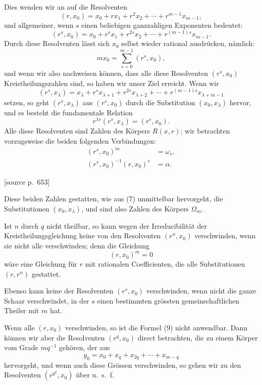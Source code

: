 \documentclass[11pt]{article}
\newcommand{\srcpage}[1]{\par\medskip\noindent\textsf{[source p.~#1]}\par\smallskip}
\begin{document}
Dies wenden wir an auf die Resolventen
\begin{equation}
  (r,x_0)=x_0+rx_1+r^2x_2+\cdots+r^{m-1}x_{m-1},
\tag{3}
\end{equation}
und allgemeiner, wenn $s$ einen beliebigen ganzzahligen Exponenten bedeutet:
\begin{equation}
  (r^s,x_0)=x_0+r^s x_1+r^{2s}x_2+\cdots+r^{(m-1)s}x_{m-1}.
\tag{4}
\end{equation}
Durch diese Resolventen lässt sich $x_0$ selbst wieder rational ausdrücken, nämlich:
\begin{equation}
  mx_0=\sum_{s=0}^{m-1}(r^s,x_0),
\tag{5}
\end{equation}
und wenn wir also nachweisen können, dass alle diese Resolventen $(r^s,x_0)$ Kreistheilungszahlen sind, so haben wir unser Ziel erreicht. Wenn wir
\begin{equation}
  (r^s,x_\lambda)=x_\lambda+r^s x_{\lambda+1}+r^{2s}x_{\lambda+2}+\cdots+r^{(m-1)s}x_{\lambda+m-1}
\tag{6}
\end{equation}
setzen, so geht $(r^s,x_\lambda)$ aus $(r^s,x_0)$ durch die Substitution $(x_0,x_\lambda)$ hervor, und es besteht die fundamentale Relation
\begin{equation}
  r^{\lambda s}(r^s,x_\lambda)=(r^s,x_0).
\tag{7}
\end{equation}
Alle diese Resolventen sind Zahlen des Körpers $R(x,r)$; wir betrachten vorzugsweise die beiden folgenden Verbindungen:
\begin{align}
  (r^s,x_0)^m &= \omega_s, \tag{8}\\
  (r^s,x_0)^{-1}(r,x_0)^s &= \alpha. \tag{9}
\end{align}

\srcpage{653}
Diese beiden Zahlen gestatten, wie aus (7) unmittelbar hervorgeht, die Substitutionen $(x_0,x_\lambda)$, und sind also Zahlen des Körpers $\Omega_m$.

Ist $n$ durch $q$ nicht theilbar, so kann wegen der Irreducibilität der Kreistheilungsgleichung keine von den Resolventen $(r^n,x_0)$ verschwinden, wenn sie nicht alle verschwinden; denn die Gleichung
\[
  (r,x_0)^m=0
\]
wäre eine Gleichung für $r$ mit rationalen Coefficienten, die alle Substitutionen $(r,r^n)$ gestattet.

Ebenso kann keine der Resolventen $(r^s,x_0)$ verschwinden, wenn nicht die ganze Schaar verschwindet, in der $s$ einen bestimmten grössten gemeinschaftlichen Theiler mit $m$ hat.

Wenn alle $(r,x_0)$ verschwinden, so ist die Formel (9) nicht anwendbar. Dann können wir aber die Resolventen $(r^q,x_0)$ direct betrachten, die zu einem Körper vom Grade $mq^{-1}$ gehören, der aus
\[
  y_0=x_0+x_q+x_{2q}+\cdots+x_{m-q}
\]
hervorgeht, und wenn auch diese Grössen verschwinden, so gehen wir zu den Resolventen $(r^{q^2},x_0)$ über u.~s.~f.
\end{document}
